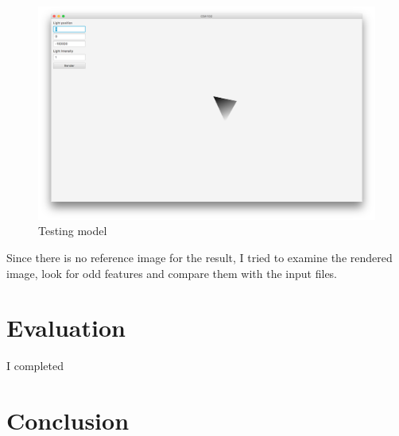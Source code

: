 \documentclass[]{article}
\begin{document}
\begin{figure}
  \includegraphics[width=\textwidth]{figures/triangle}
  \caption{Testing model}
  \label{fig:triangle}
\end{figure}

Since there is no reference image for the result, I tried to examine the rendered image, look for odd features and compare them with the input files.

\section{Evaluation}

I completed 

\section{Conclusion}
\end{document}
